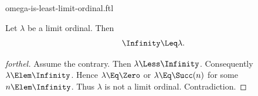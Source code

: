 \documentclass{stex}
\begin{document}
\begin{smodule}{omega-is-least-limit-ordinal.ftl}


\begin{proposition*}[forthel]
  Let $\lambda$ be a limit ordinal.
  Then \[ \Infinity \Leq \lambda. \]
\end{proposition*}
\begin{proof}[forthel]
  Assume the contrary.
  Then $\lambda \Less \Infinity$.
  Consequently $\lambda \Elem \Infinity$.
  Hence $\lambda \Eq \Zero$ or $\lambda \Eq \Succ(n)$ for some $n \Elem \Infinity$.
  Thus $\lambda$ is not a limit ordinal.
  Contradiction.
\end{proof}

\end{smodule}
\end{document}
